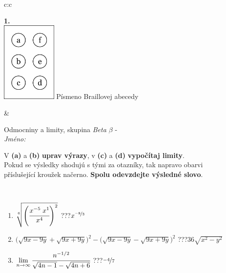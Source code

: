 \documentclass[10pt]{report}
\begin{document}
\begin{tabular}{c:c}
\begin{minipage}[c][104.5mm][t]{0.5\linewidth}
\begin{center}
\begin{minipage}{0.20\linewidth}
\begin{center}
{\Huge\bfseries 1.} \\[2mm]
\includegraphics[height=40mm]{../images/braille.png}
{\small Písmeno Braillovej abecedy}
\end{center}
\end{minipage}
\end{center}
\end{minipage}
&
\begin{minipage}[c][104.5mm][t]{0.5\linewidth}
\begin{center}
\vspace{7mm}
{\huge Odmocniny a limity, skupina \textit{Beta $\beta$} -}\\[5mm]
\textit{Jméno:}\phantom{xxxxxxxxxxxxxxxxxxxxxxxxxxxxxxxxxxxxxxxxxxxxxxxxxxxxxxxxxxxxxxxxx}\\[5mm]
\begin{minipage}{0.95\linewidth}
\begin{center}
V \textbf{(a)} a \textbf{(b)} \textbf{uprav výrazy}, v \textbf{(c)} a \textbf{(d)} \textbf{vypočítaj limity}.\\Pokud se výsledky shodujú s tými za otazníky, tak napravo obarvi\\příslušející kroužek načerno. \textbf{Spolu odevzdejte výsledné slovo}.
\end{center}
\end{minipage}
\\[1mm]
\begin{minipage}{0.79\linewidth}
\begin{center}
\begin{varwidth}{\linewidth}
\begin{enumerate}
\small
\item $\sqrt[6]{\left(\cfrac{x^{-5}\;x^{1}}{x^{4}}\right)^{2}}$\quad \dotfill\; ???\;\dotfill \quad $x^{\nicefrac{-8}{3}}$
\item {\footnotesize{\scriptsize$\big(\sqrt{9x-9y}+\sqrt{9x+9y}\big)^2-\big(\sqrt{9x-9y}-\sqrt{9x+9y}\big)^2$}\quad \dotfill\; ???\;\dotfill \quad $36\sqrt{x^2-y^2}$}
\item $\lim\limits_{n\to\infty}\cfrac{n^{-1/2}}{\sqrt{4n-1}-\sqrt{4n+6}}$\quad \dotfill\; ???\;\dotfill \quad $\nicefrac{-4}{7}$

\end{enumerate}
\end{varwidth}
\end{center}
\end{minipage}
\end{center}
\end{minipage}
\end{tabular}
\end{document}
